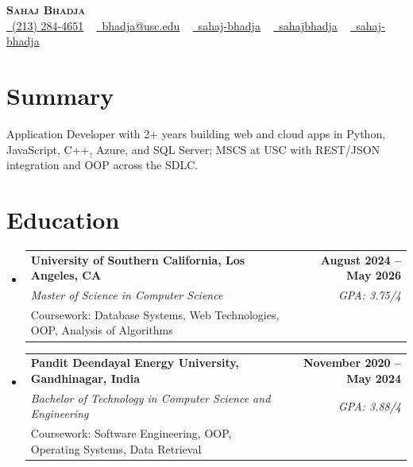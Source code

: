 \documentclass[letterpaper,10pt]{article}
\makeatletter
\newcommand{\resumeEduSubheading}[5]{\vspace{-1pt}\item\begin{tabular*}{1.0\textwidth}[t]{l@{\extracolsep{\fill}}r}\textbf{#1} & \textbf{\small #2} \\\textit{\small #3} & \textit{\small #4} \\\small #5 & \\\end{tabular*}\vspace{-4pt}}
\newcommand{\resumeSubHeadingListStart}{\begin{itemize}[leftmargin=0.0in, label={}]}
\newcommand{\resumeSubHeadingListEnd}{\end{itemize}}
\makeatother
\begin{document}
\begin{center}
{\Huge \scshape \textbf{Sahaj Bhadja}} \\ \vspace{1pt}
\small \href{tel:(213) 284-4651}{\faPhone\ \underline{(213) 284-4651}} ~ \href{mailto: bhadja@usc.edu}{\raisebox{-0.2\height}\faEnvelope\ \underline{bhadja@usc.edu}} ~
\href{https://www.linkedin.com/in/sahaj-bhadja/}{\raisebox{-0.2\height}\faLinkedin\ \underline{sahaj-bhadja}} ~ \href{https://github.com/SAHAJ-BHADJA}{\raisebox{-0.2\height}\faGithub\ \underline{sahajbhadja}} ~
\href{https://sahaj-bhadja.vercel.app/}{\raisebox{-0.2\height}\faGlobe\ \underline{sahaj-bhadja}}
\end{center}
\vspace{-16pt}
\section{Summary}
\begin{itemize}[leftmargin=0.15in, label={}]
\small{\item{Application Developer with 2+ years building web and cloud apps in Python, JavaScript, C++, Azure, and SQL Server; MSCS at USC with REST/JSON integration and OOP across the SDLC.}}
\end{itemize}
\vspace{-6pt}
\section{Education}
\resumeSubHeadingListStart
\resumeEduSubheading{University of Southern California, Los Angeles, CA}{August 2024 -- May 2026}{Master of Science in Computer Science}{GPA: 3.75/4}{Coursework: Database Systems, Web Technologies, OOP, Analysis of Algorithms}
\vspace{-9pt}
\resumeEduSubheading{Pandit Deendayal Energy University, Gandhinagar, India}{November 2020 -- May 2024}{Bachelor of Technology in Computer Science and Engineering}{GPA: 3.88/4}{Coursework: Software Engineering, OOP, Operating Systems, Data Retrieval}
\resumeSubHeadingListEnd
\vspace{-6pt}
\end{document}
